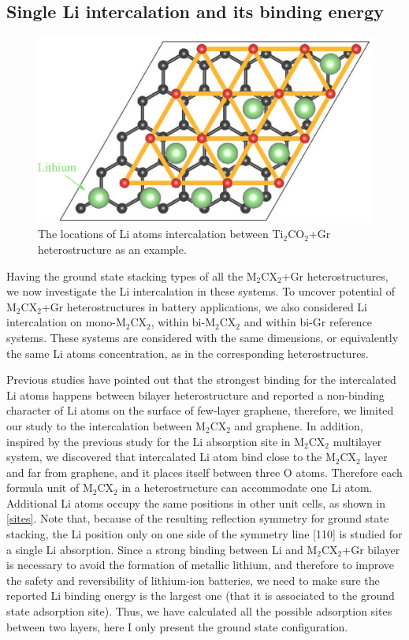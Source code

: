 \subsection{Single Li intercalation and its binding energy}

\begin{figure}[htb]
\centering
\includegraphics[width=0.8\linewidth]{sites.eps}%
\caption{The locations of Li atoms intercalation between Ti$_2$CO$_2$+Gr heterostructure as an example.  \label{sites}}
\end{figure}

Having the ground state stacking types of all the M$_2$CX$_2$+Gr heterostructures, we now investigate the Li intercalation in these systems. To uncover potential of M$_2$CX$_2$+Gr heterostructures in battery applications, we also considered Li intercalation on mono-M$_2$CX$_2$, within bi-M$_2$CX$_2$ and within bi-Gr reference systems. These systems are considered with the same dimensions, or equivalently the same Li atoms concentration, as in the corresponding heterostructures.

Previous studies\cite{Guo2015,Samad2016,Lee2012} have pointed out that the strongest binding for the intercalated Li atoms happens between bilayer heterostructure and reported a non-binding character of Li atoms on the surface of few-layer graphene, therefore,  we limited our study to the intercalation between M$_2$CX$_2$ and graphene. In addition, inspired by the previous study\cite{doi:10.1063/1.4939745} for the Li absorption site in M$_2$CX$_2$ multilayer system, we discovered that intercalated Li atom bind close to the M$_2$CX$_2$ layer and far from graphene, and it places itself between three O atoms. Therefore each formula unit of M$_2$CX$_2$ in a heterostructure can accommodate one Li atom. Additional Li atoms occupy the same positions in other unit cells, as shown in \autoref{sites}. Note that, because of the resulting reflection symmetry for ground state stacking, the Li position only on one side of the symmetry line [110] is studied for a single Li absorption.  Since a strong binding between Li and M$_2$CX$_2$+Gr bilayer is necessary to avoid the formation of metallic lithium, and therefore to improve the safety and reversibility of lithium-ion batteries, we need to make sure the reported Li binding energy is the largest one (that it is associated to the ground state adsorption site). Thus, we have calculated all the possible adsorption sites between two layers, here I only present the ground state configuration.

